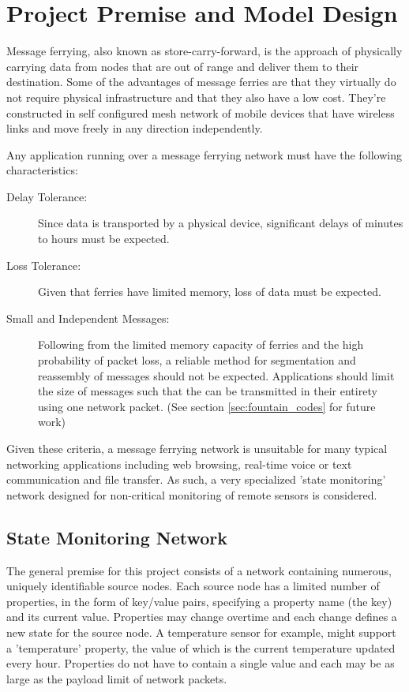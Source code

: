 \chapter{Project Premise and Model Design} 



Message ferrying, also known as store-carry-forward, is the approach of physically carrying data from nodes that are out of range and deliver them to their destination. 
Some of the advantages of message ferries are that they virtually do not require physical infrastructure and that they also have a low cost. 
They're constructed in self configured mesh network of mobile devices that have wireless links and move freely in any direction independently. 
	


Any application running over a message ferrying network must have the following characteristics:

\begin{description}
\item[Delay Tolerance: ]
Since data is transported by a physical device, significant delays of minutes to hours must be expected.
\item[Loss Tolerance: ]
Given that ferries have limited memory, loss of data must be expected.
\item[Small and Independent Messages: ]
Following from the limited memory capacity of ferries and the high probability of packet loss, a reliable method for segmentation and reassembly of messages should not be expected. 
Applications should limit the size of messages such that the can be transmitted in their entirety using one network packet.
%
(See section \ref{sec:fountain_codes} for future work)
\end{description}

Given these criteria, a message ferrying network is unsuitable for many typical networking applications including web browsing, real-time voice or text communication and file transfer.
As such, a very specialized 'state monitoring' network designed for non-critical monitoring of remote sensors is considered.

\section{State Monitoring Network}

The general premise for this project consists of a network containing numerous, uniquely identifiable source nodes. 
Each source node has a limited number of properties, in the form of key/value pairs, specifying a property name (the key) and its current value.
Properties may change overtime and each change defines a new state for the source node.
A temperature sensor for example, might support a 'temperature' property, the value of which is the current temperature updated every hour.
Properties do not have to contain a single value and each may be as large as the payload limit of network packets. %

